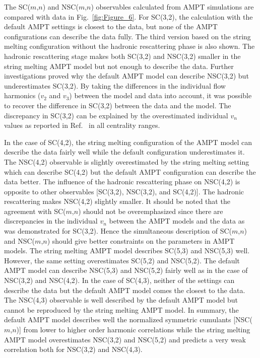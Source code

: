 The SC($m$,$n$) and NSC($m$,$n$) observables calculated from AMPT simulations are compared with data in Fig.~\ref{fig:Figure_6}.
For SC(3,2), the calculation with the default AMPT settings is closest to the data, but none of the AMPT configurations can describe the data fully. 
The third version based on the string melting configuration without the hadronic rescattering phase is also shown.
The hadronic rescattering stage makes both SC(3,2) and NSC(3,2) smaller in the string melting AMPT model but not enough to describe the data.
Further investigations proved why the default AMPT model can describe NSC(3,2) but underestimates SC(3,2). By taking the differences in the individual flow harmonics ($v_2$ and $v_3$) between the model and data into account, it was possible to recover the difference in SC(3,2) between the data and the model. The discrepancy in SC(3,2) can be explained by the overestimated individual $v_n$ values as reported in Ref.~\cite{Adam:2016nfo} in all centrality ranges. 

In the case of SC(4,2), the string melting configuration of the AMPT model can describe the data fairly well while the default configuration underestimates it.
The NSC(4,2) observable is slightly overestimated by the string melting setting which can describe SC(4,2) but the default AMPT configuration can describe the data better.
The influence of the hadronic rescattering phase on NSC(4,2) is opposite to other observables [SC(3,2), NSC(3,2), and SC(4,2)]. The hadronic rescattering makes NSC(4,2) slightly smaller.
It should be noted that the agreement with SC($m$,$n$) should not be overemphasized since there are discrepancies in the individual $v_n$ between the AMPT models and the data as was demonstrated for SC(3,2).
Hence the simultaneous description of SC($m$,$n$) and NSC($m$,$n$) should give better constraints on the parameters in AMPT models.
The string melting AMPT model describes SC(5,3) and NSC(5,3) well. However, the same setting overestimates SC(5,2) and NSC(5,2). 
The default AMPT model can describe NSC(5,3) and NSC(5,2) fairly well as in the case of NSC(3,2) and NSC(4,2).
In the case of SC(4,3), neither of the settings can describe the data but the default AMPT model comes the closest to the data. 
The NSC(4,3) observable is well described by the default AMPT model but cannot be reproduced by the string melting AMPT model.
In summary, the default AMPT model describes well the normalized symmetric cumulants [NSC($m$,$n$)] from lower to higher order harmonic correlations while the string melting AMPT model overestimates NSC(3,2) and NSC(5,2) and predicts a very weak correlation both for NSC(3,2) and NSC(4,3). 

